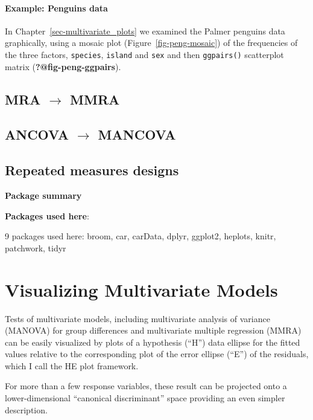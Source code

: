 \documentclass[
  letterpaper,
  10pt,
  krantz2]{krantz}
\begin{document}
\subsubsection*{Example: Penguins data}\label{example-penguins-data}

In Chapter~\ref{sec-multivariate_plots} we examined the Palmer penguins
data graphically, using a mosaic plot (Figure~\ref{fig-peng-mosaic}) of
the frequencies of the three factors, \texttt{species}, \texttt{island}
and \texttt{sex} and then \texttt{ggpairs()} scatterplot matrix
(\textbf{?@fig-peng-ggpairs}).

\section{\texorpdfstring{MRA \(\rightarrow\)
MMRA}{MRA \textbackslash rightarrow MMRA}}\label{mra-rightarrow-mmra}

\section{\texorpdfstring{ANCOVA \(\rightarrow\)
MANCOVA}{ANCOVA \textbackslash rightarrow MANCOVA}}\label{ancova-rightarrow-mancova}

\section{Repeated measures designs}\label{repeated-measures-designs}

\textbf{Package summary}

\textbf{Packages used here}:

9 packages used here: broom, car, carData, dplyr, ggplot2, heplots,
knitr, patchwork, tidyr

\chapter{Visualizing Multivariate Models}\label{sec-vis-mlm}

Tests of multivariate models, including multivariate analysis of
variance (MANOVA) for group differences and multivariate multiple
regression (MMRA) can be easily visualized by plots of a hypothesis
(``H'') data ellipse for the fitted values relative to the corresponding
plot of the error ellipse (``E'') of the residuals, which I call the HE
plot framework.

For more than a few response variables, these result can be projected
onto a lower-dimensional ``canonical discriminant'' space providing an
even simpler description.
\end{document}
